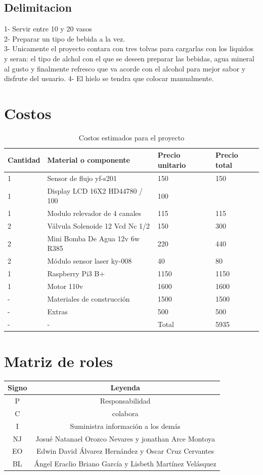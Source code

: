 \documentclass[12pt,a4paper]{article}
\begin{document}
\subsection{Delimitacion}
1- Servir entre 10 y 20 vasos\\
2- Preparar un tipo de bebida a la vez.\\
3- Unicamente el proyecto contara con tres tolvas para cargarlas con los liquidos y seran: el tipo de alchol con el que se deseen preparar las bebidas, agua mineral al gusto y finalmente refresco que va acorde con el alcohol para mejor sabor y disfrute del usuario.
4- El hielo se tendra que colocar manualmente.

\section{Costos}
\begin{table}[H]
\centering
\begin{tabular}{|m{3.5cm}|m{3.5cm}|m{3.5cm}|m{3.5cm}|}
\hline

Cantidad  & Material o componente  & Precio unitario & Precio total\\
\hline
1 & Sensor de flujo yf-s201 & 150 & 150\\
\hline
1 & Display LCD 16X2 HD44780 / 100 & 100\\
\hline
1 & Modulo relevador de 4 canales & 115 & 115\\
\hline
2 & Válvula Solenoide 12 Vcd Nc 1/2 & 150 & 300 \\
\hline
2 & Mini Bomba De Agua 12v 6w R385 & 220 & 440 \\
\hline
2 &  Módulo sensor laser ky-008 & 40 & 80 \\
\hline
1 & Raspberry Pi3 B+ & 1150 & 1150 \\
\hline 
1 & Motor 110v & 1600 & 1600 \\
\hline
- & Materiales de construcción & 1500 & 1500 \\
\hline
- & Extras & 500 & 500\\
\hline
- & - & Total & 5935\\
\hline



\end{tabular}
\caption{Costos estimados para el proyecto}
\label{lineas}
\end{table}
\section{Matriz de roles}
\begin{tabular}{|c|c|}
\hline 
Signo  & Leyenda  \\ 
\hline 
P & Responsabilidad \\ 
\hline 
C & colabora \\ 
\hline 
I & Suministra información a los demás  \\ 
\hline 
NJ & Josué Natanael Orozco Nevares y jonathan Arce Montoya  \\ 
\hline 
EO & Edwin David Álvarez Hernández y Oscar Cruz Cervantes  \\ 
\hline 
BL & Ángel Eraclio Briano García y Lisbeth Martínez Velásquez \\ 
\hline 
\end{tabular} 
\end{document}
